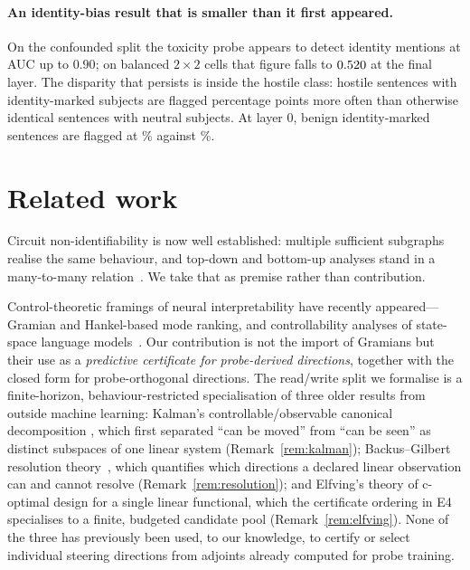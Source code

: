 \documentclass[11pt]{article}
\theoremstyle{definition}
\theoremstyle{remark}
\begin{document}
\paragraph{An identity-bias result that is smaller than it first appeared.}
On the confounded split the toxicity probe appears to detect identity mentions
at AUC up to $0.90$; on balanced $2\times2$ cells that figure falls to
$0.520$ at the final layer. The disparity that persists is inside
the hostile class: hostile sentences with identity-marked subjects are flagged
\EthreeHostileGap{} percentage points more often than otherwise identical
sentences with neutral subjects. At layer $0$, benign identity-marked sentences
are flagged at \EthreeFPRidentZero\% against \EthreeFPRneutZero\%.

\section{Related work}

Circuit non-identifiability is now well established: multiple sufficient
subgraphs realise the same behaviour, and top-down and bottom-up analyses stand
in a many-to-many relation~\cite{eeao2025,uniq2026,manycircuits2026,certified2026}.
We take that as premise rather than contribution.

Control-theoretic framings of neural interpretability have recently
appeared---Gramian and Hankel-based mode ranking, and controllability analyses of
state-space language models~\cite{blackbox2025,ssmctrl2025}. Our contribution is
not the import of Gramians but their use as a \emph{predictive certificate for
probe-derived directions}, together with the closed form for probe-orthogonal
directions. The read/write split we formalise is a finite-horizon,
behaviour-restricted specialisation of three older results from outside
machine learning: Kalman's controllable/observable canonical decomposition
\cite{kalman1963}, which first separated ``can be moved'' from ``can be
seen'' as distinct subspaces of one linear system (Remark~\ref{rem:kalman});
Backus--Gilbert resolution theory~\cite{backusgilbert1968}, which quantifies
which directions a declared linear observation can and cannot resolve
(Remark~\ref{rem:resolution}); and Elfving's theory of c-optimal design
\cite{elfving1952} for a single linear functional, which the certificate
ordering in E4 specialises to a finite, budgeted candidate pool
(Remark~\ref{rem:elfving}). None of the three has previously been used, to
our knowledge, to certify or select individual steering directions from
adjoints already computed for probe training.
\end{document}
